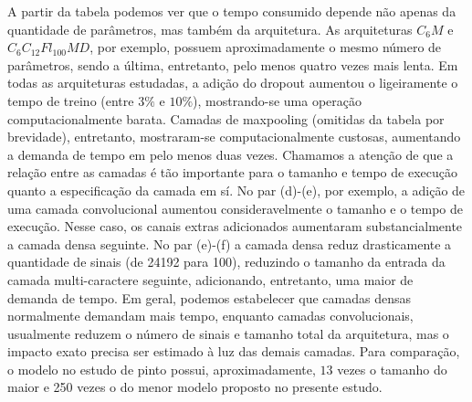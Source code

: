 A partir da tabela podemos ver que o tempo consumido depende não apenas da quantidade de parâmetros, mas também da arquitetura. As arquiteturas $C_6M$ e $C_6C_{12}Fl_{100}MD$, por exemplo, possuem aproximadamente o mesmo número de parâmetros, sendo a última, entretanto, pelo menos quatro vezes mais lenta. Em todas as arquiteturas estudadas, a adição do dropout aumentou o ligeiramente o tempo de treino (entre $3\%$ e $10\%$), mostrando-se uma operação computacionalmente barata. Camadas de maxpooling (omitidas da tabela por brevidade), entretanto, mostraram-se computacionalmente custosas, aumentando a demanda de tempo em pelo menos duas vezes. Chamamos a atenção de que a relação entre as camadas é tão importante para o tamanho e tempo de execução quanto a especificação da camada em sí. No par (d)-(e), por exemplo, a adição de uma camada convolucional aumentou consideravelmente o tamanho e o tempo de execução. Nesse caso, os canais extras adicionados aumentaram substancialmente a camada densa seguinte. No par (e)-(f) a camada densa reduz drasticamente a quantidade de sinais (de 24192 para 100), reduzindo o tamanho da entrada da camada multi-caractere seguinte, adicionando, entretanto, uma maior de demanda de tempo. Em geral, podemos estabelecer que camadas densas normalmente demandam mais tempo, enquanto camadas convolucionais, usualmente reduzem o número de sinais e tamanho total da arquitetura, mas o impacto exato precisa ser estimado à luz das demais camadas. Para comparação, o modelo no estudo de pinto possui, aproximadamente, $13$ vezes o tamanho do maior e 250 vezes o do menor modelo proposto no presente estudo.   

